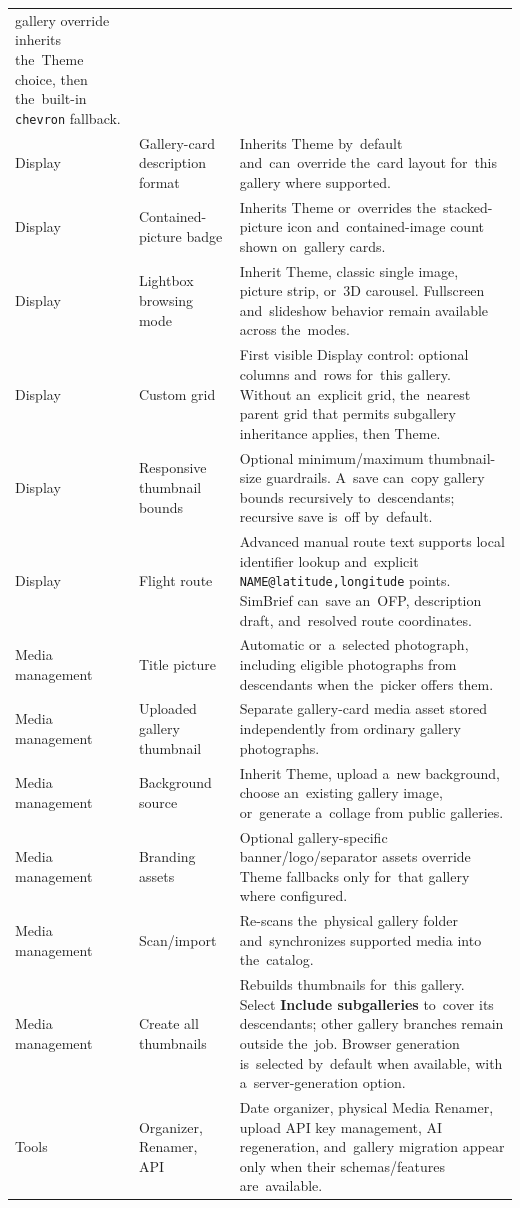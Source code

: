 \documentclass[11pt,a4paper]{article}
\newcommand{\ui}[1]{\textbf{#1}}
\newcommand{\codeword}[1]{\nolinkurl{#1}}
\begin{document}
\begin{longtable}{%
    >{\raggedright\arraybackslash}p{}%
    >{\raggedright\arraybackslash}p{}%
    >{\raggedright\arraybackslash}p{}%
}
gallery override inherits the~Theme choice, then the~built-in \codeword{chevron}
fallback.\\
Display & Gallery-card description format & Inherits Theme by~default
and~can~override the~card layout for~this gallery where supported.\\
Display & Contained-picture badge & Inherits Theme or~overrides
the~stacked-picture icon and~contained-image count shown on~gallery cards.\\
Display & Lightbox browsing mode & Inherit Theme, classic single image, picture
strip, or~3D carousel. Fullscreen and~slideshow behavior remain available across
the~modes.\\
Display & Custom grid & First visible Display control: optional columns and~rows
for~this gallery. Without an~explicit grid, the~nearest parent grid that permits
subgallery inheritance applies, then Theme.\\
Display & Responsive thumbnail bounds & Optional minimum/maximum thumbnail-size
guardrails. A~save can~copy gallery bounds recursively to~descendants; recursive
save is~off by~default.\\
Display & Flight route & Advanced manual route text supports local identifier
lookup and~explicit \codeword{NAME@latitude,longitude} points. SimBrief can~save
an~OFP, description draft, and~resolved route coordinates.\\
Media management & Title picture & Automatic or~a~selected photograph, including
eligible photographs from descendants when the~picker offers them.\\
Media management & Uploaded gallery thumbnail & Separate gallery-card media
asset stored independently from ordinary gallery photographs.\\
Media management & Background source & Inherit Theme, upload a~new background,
choose an~existing gallery image, or~generate a~collage from public galleries.\\
Media management & Branding assets & Optional gallery-specific
banner/logo/separator assets override Theme fallbacks only for~that gallery
where configured.\\
Media management & Scan/import & Re-scans the~physical gallery folder
and~synchronizes supported media into the~catalog.\\
Media management & Create all thumbnails & Rebuilds thumbnails for~this gallery.
Select \ui{Include subgalleries} to~cover its descendants; other gallery
branches remain outside the~job. Browser generation is~selected by~default when
available, with a~server-generation option.\\
Tools & Organizer, Renamer, API & Date organizer, physical Media Renamer, upload
API key management, AI regeneration, and~gallery migration appear only when
their schemas/features are~available.\\
\bottomrule
\end{longtable}
\end{document}
